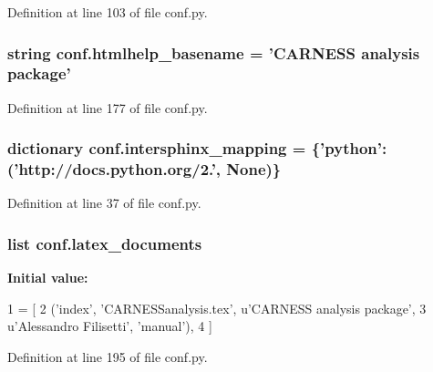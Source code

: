 Definition at line 103 of file conf.\-py.

\hypertarget{a00101_aab7fddb2766ce3c430d8246fbfdbc7b1}{
\subsubsection[{htmlhelp\-\_\-basename}]{\setlength{\rightskip}{0pt plus 5cm}string conf.\-htmlhelp\-\_\-basename = 'C\-A\-R\-N\-E\-S\-S {\bf analysis} package'}}\label{a00101_aab7fddb2766ce3c430d8246fbfdbc7b1}


Definition at line 177 of file conf.\-py.

\hypertarget{a00101_a8375f4f963de3ac8026eaa9beced9564}{
\subsubsection[{intersphinx\-\_\-mapping}]{\setlength{\rightskip}{0pt plus 5cm}dictionary conf.\-intersphinx\-\_\-mapping = \{'python'\-: ('http\-://docs.\-python.\-org/2.', None)\}}}\label{a00101_a8375f4f963de3ac8026eaa9beced9564}


Definition at line 37 of file conf.\-py.

\hypertarget{a00101_a7812f49970f3de0d15dd7b9b9a10e3a1}{
\subsubsection[{latex\-\_\-documents}]{\setlength{\rightskip}{0pt plus 5cm}list conf.\-latex\-\_\-documents}}\label{a00101_a7812f49970f3de0d15dd7b9b9a10e3a1}
{\bfseries Initial value\-:}
\begin{DoxyCode}
1 = [
2   (\textcolor{stringliteral}{'index'}, \textcolor{stringliteral}{'CARNESSanalysis.tex'}, \textcolor{stringliteral}{u'CARNESS analysis package'},
3    \textcolor{stringliteral}{u'Alessandro Filisetti'}, \textcolor{stringliteral}{'manual'}),
4 ]
\end{DoxyCode}


Definition at line 195 of file conf.\-py.

